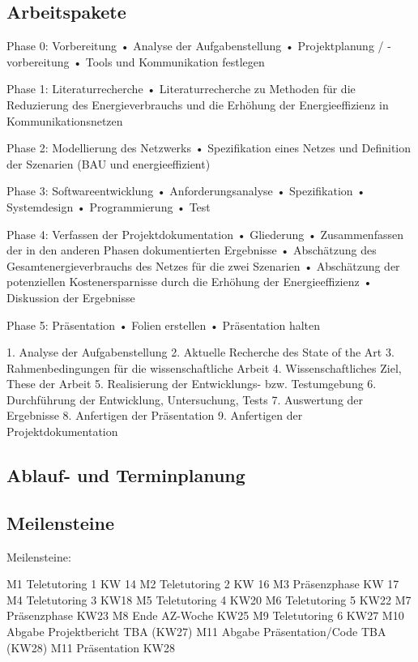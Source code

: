 \documentclass[12pt,titlepage]{article}
\begin{document}
 
 
\subsection{Arbeitspakete}
Phase 0: Vorbereitung
•	Analyse der Aufgabenstellung
•	Projektplanung / -vorbereitung
•	Tools und Kommunikation festlegen
 
Phase 1: Literaturrecherche
•	Literaturrecherche zu Methoden für die Reduzierung des Energieverbrauchs und die Erhöhung der Energieeffizienz in Kommunikationsnetzen
 
Phase 2: Modellierung des Netzwerks
•	Spezifikation eines Netzes und Definition der Szenarien (BAU und energieeffizient)
 
Phase 3: Softwareentwicklung
•	Anforderungsanalyse
•	Spezifikation
•	Systemdesign
•	Programmierung
•	Test
 
Phase 4: Verfassen der Projektdokumentation
•	Gliederung
•	Zusammenfassen der in den anderen Phasen dokumentierten Ergebnisse
•	Abschätzung des Gesamtenergieverbrauchs des Netzes für die zwei Szenarien
•	Abschätzung der potenziellen Kostenersparnisse durch die Erhöhung der Energieeffizienz
•	Diskussion der Ergebnisse
 
Phase 5: Präsentation
•	Folien erstellen
•	Präsentation halten
 

 
 
1. Analyse der Aufgabenstellung
2. Aktuelle Recherche des State of the Art
3. Rahmenbedingungen für die wissenschaftliche Arbeit
4. Wissenschaftliches Ziel, These der Arbeit
5. Realisierung der Entwicklungs- bzw. Testumgebung
6. Durchführung der Entwicklung, Untersuchung, Tests
7. Auswertung der Ergebnisse
8. Anfertigen der Präsentation
9. Anfertigen der Projektdokumentation
 
\subsection{Ablauf- und Terminplanung}

 \subsection{Meilensteine}
Meilensteine:
 
M1 Teletutoring 1	KW 14
M2 Teletutoring 2	KW 16
M3 Präsenzphase	KW 17
M4 Teletutoring 3	KW18
M5 Teletutoring 4	KW20
M6 Teletutoring 5	KW22
M7 Präsenzphase	KW23
M8 Ende AZ-Woche	KW25
M9 Teletutoring 6	KW27
M10 Abgabe Projektbericht	TBA (KW27)
M11 Abgabe Präsentation/Code	TBA (KW28)
M11 Präsentation	KW28
 
\end{document}
